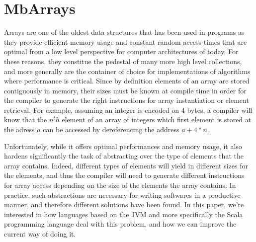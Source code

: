 \section{MbArrays}
\label{sec:mbarrays}


Arrays are one of the oldest data structures that has been used in programs as they provide efficient memory usage and constant random access times that are optimal from a low level perspective for computer architectures of today. For these reasons, they constitue the pedestal of many more high level collections, and more generally are the container of choice for implementations of algorithms where performance is critical. Since by definition elements of an array are stored contiguously in memory, their sizes must be known at compile time in order for the compiler to generate the right instructions for array instantiation or element retrieval. For example, assuming an integer is encoded on 4 bytes, a compiler will know that the $n^th$ element of an array of integers which first element is stored at the adress $a$ can be accessed by dereferencing the address $a + 4*n$.


Unfortunately, while it offers optimal performances and memory usage, it also hardens significantly the task of abstracting over the type of elements that the array contains. Indeed, different types of elements will yield in different sizes for the elements, and thus the compiler will need to generate different instructions for array access depending on the size of the elements the array contains. In practice, such abstractions are necessary for writing softwares in a productive manner, and therefore different solutions have been found. In this paper, we're interested in how languages based on the JVM and more specifically the Scala programming language deal with this problem, and how we can improve the current way of doing it. 

